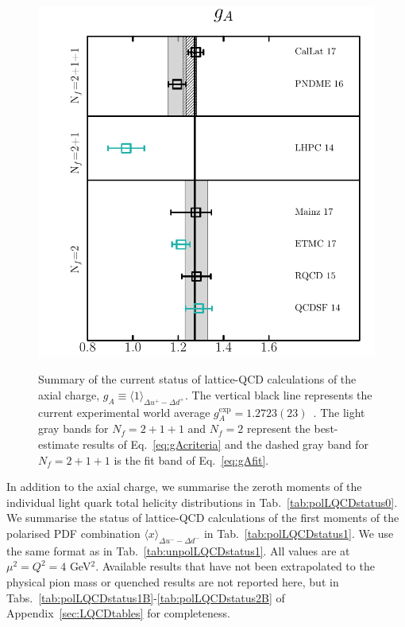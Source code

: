 \begin{figure}[t]
\centering
\includegraphics[scale=0.7]{plots/ga_summary.pdf}\\
\caption{\small Summary of the current status of lattice-QCD calculations of 
the axial charge, $g_A\equiv \langle 1\rangle_{\Delta u^+-\Delta d^+}$.
%
The vertical black line represents the current experimental world average 
$g_A^{\mathrm{exp}} = 1.2723(23)$~\cite{Olive:2016xmw}. 
%
The light gray bands for $N_f=2+1+1$ and $N_f=2$ represent the best-estimate 
results of Eq.~\eqref{eq:gAcriteria} and the dashed gray band for
$N_f=2+1+1$ is the fit band of Eq.~\eqref{eq:gAfit}. 
%
}    
\label{fig:gaLQCDstatus}
\end{figure}

In addition to the axial charge, we summarise the zeroth moments of the 
individual light quark total helicity distributions in 
Tab.~\ref{tab:polLQCDstatus0}. 
%
We summarise the status of lattice-QCD calculations of the
first moments of the polarised PDF combination 
$\langle x \rangle_{\Delta u^- - \Delta d^-}$ in Tab.~\ref{tab:polLQCDstatus1}. 
%
We use the same format as in Tab.~\ref{tab:unpolLQCDstatus1}.
%
All values are at $\mu^2=Q^2=4$ GeV$^2$.
%
Available results that have not been extrapolated to the physical pion mass
or quenched results are not reported here, but in 
Tabs.~\ref{tab:polLQCDstatus1B}-\ref{tab:polLQCDstatus2B} of
Appendix~\ref{sec:LQCDtables} for completeness.

